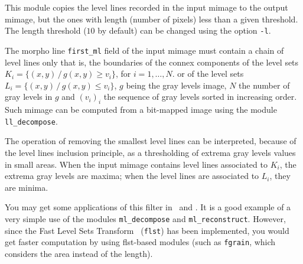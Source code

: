 This module copies the level lines recorded in the 
input mimage to the output mimage, but the ones with length (number of pixels)
less than a given threshold. 
The length threshold ($10$ by default) can be changed using the option
\verb+-l+.

The morpho line \verb+first_ml+ field of the input mimage must contain a
chain of level lines only that is, the boundaries of the connex components 
of the level sets 
$K_i=\{ (x,y)\,/\, g(x,y)\geq v_i\}$, for $i=1,\ldots,N$.
or of the level sets
$L_i=\{ (x,y)\,/\, g(x,y)\leq v_i\}$,
$g$ being the gray levels image, $N$ the number of gray levels in $g$
and $(v_i)_i$ the sequence of gray levels sorted in increasing order.
Such mimage can be computed from a bit-mapped image using the module
\verb+ll_decompose+.

The operation of removing the smallest level lines can be interpreted, because
of the level lines inclusion principle, as a thresholding of extrema gray
levels values in small areas.
When the input mimage contains level lines associated to $K_i$, the extrema
gray levels are maxima; when the level lines are associated to $L_i$, they
are minima.

You may get some applications of this filter in~\cite{froment:perceptible}
and \cite{froment:functional}.
It is a good example of a very simple use of the modules \verb+ml_decompose+ and
\verb+ml_reconstruct+. However, since the Fast Level Sets 
Transform~\cite{monasse.guichard:fast} (\verb+flst+) has been implemented, 
you would get faster computation by using flst-based modules 
(such as \verb+fgrain+, which considers the area instead of the length).